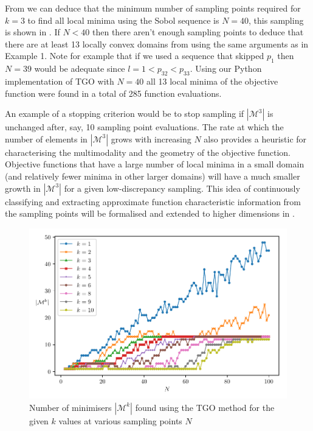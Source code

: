 From  we can deduce that the minimum number of sampling points required for $k = 3$ to find all local minima using the Sobol sequence is $N = 40$, this sampling is shown in .  If  $N < 40$ then there aren't enough sampling points to deduce that there are at least 13 locally convex domains from using the same arguments as in Example 1. Note for example that if we used a sequence that skipped $p_1$ then $N =39$ would be adequate since $l = 1 < p_{32} < p_{33}$. Using our Python implementation of TGO \cite{TGOpy} with $N = 40$ all 13 local minima of the objective function were found in a total of 285 function evaluations. 

An example of a stopping criterion would be to stop sampling if $|\mathcal{M}^3|$ is unchanged after, say, 10 sampling point evaluations. The rate at which the number of elements in $|\mathcal{M}^3|$ grows with increasing $N$ also provides a heuristic for characterising the multimodality and the geometry of the objective function. Objective functions that have a large number of local minima in a small domain (and relatively fewer minima in other larger domains) will have a much smaller growth in $|\mathcal{M}^3|$ for a given low-discrepancy sampling. This idea of continuously classifying and extracting approximate function characteristic information from the sampling points will be formalised and extended to higher dimensions in .


\begin{figure}  \label{fig:mink2}
\centerline{\includegraphics[scale=1.0]{./Fig4.pdf}}
{\caption{Number of minimisers $|\mathcal{M}^k|$ found using the TGO method for the given $k$ values at various sampling points $N$}  \label{fig:mink2}}
\end{figure}

